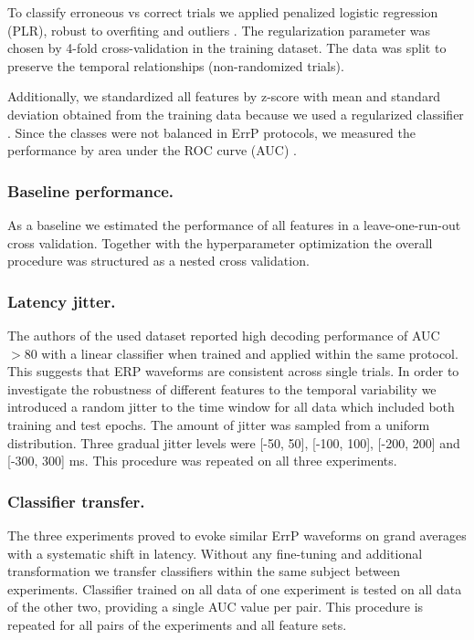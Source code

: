 \documentclass[12pt]{iopart}
\begin{document}
To classify erroneous vs correct trials we applied penalized logistic regression (PLR), robust to overfiting and
outliers \cite{parra_recipes_2005}. The regularization parameter was chosen by 4-fold cross-validation in the
training dataset. The data was split to preserve the
temporal relationships (non-randomized trials).

Additionally, we standardized all features by z-score with mean and standard deviation
obtained from the training data because we used a regularized classifier \cite{hastie_elements_2009}.
Since the classes
were not balanced in ErrP protocols, we measured the performance by area under the ROC curve (AUC) 
\cite{bradley_use_1997}.


\subsubsection*{Baseline performance.} 
As a baseline we estimated the performance of all features in a leave-one-run-out cross validation.
Together with the hyperparameter optimization the overall procedure was structured as
a nested cross validation.


\subsubsection*{Latency jitter.} 
The authors of the used dataset reported high decoding performance of AUC $> 80$ with a linear classifier
when trained and applied within the same protocol.
This suggests that ERP waveforms are consistent across single trials.
In order to investigate the robustness of different features
to the temporal variability we introduced a random jitter to the time window
for all data which included both training and test epochs. The amount of jitter was sampled from a uniform distribution.
Three gradual jitter levels were [-50, 50], [-100, 100], [-200, 200] and [-300, 300] ms.
This procedure was repeated on all three experiments.

\subsubsection*{Classifier transfer.}
The three experiments proved to evoke similar ErrP waveforms on grand averages with a 
systematic shift in latency. Without any fine-tuning and additional
transformation we transfer classifiers within the same subject
between experiments. Classifier trained on all data of one experiment
is tested on all data of the other two, providing a single AUC value per pair.
This procedure is repeated for all pairs of the experiments and all feature sets.
\end{document}
